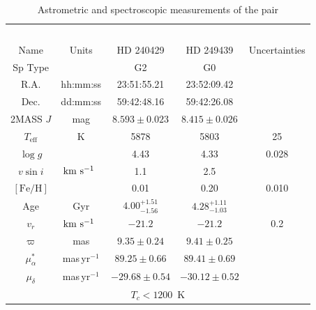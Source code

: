 \documentclass[12pt,letterpaper,margin=1in]{article}
\newcommand*\elem[1]{\ensuremath{\mathrm{#1}}}
\newcommand{\sunanalog}{\text{Krios}}
\newcommand{\bizarreone}{\text{Kronos}}
\newcommand{\kms}{\ensuremath{\rm km~s^{-1}}}
\begin{document}
\begin{table}[htpb]
  \centering
  \begin{threeparttable}
  \caption{Astrometric and spectroscopic measurements of the pair\label{tab:t1}}
\begin{tabular}{ccccc}
\hline\hline
                        &                & \sunanalog\            & \bizarreone\           &               \\
Name                    & Units          & HD 240429              & HD 249439              & Uncertainties \\
\hline
Sp Type                 &                & G2                     & G0                     &               \\
R.A.\tnote{a}           & hh:mm:ss       & 23:51:55.21            & 23:52:09.42            &               \\
Dec.\tnote{a}           & dd:mm:ss       & 59:42:48.16            & 59:42:26.08            &               \\
2MASS $J$\tnote{a}      & mag            & $8.593 \pm 0.023$      & $8.415 \pm 0.026$      &               \\
$T_\mathrm{eff}$        & K              & 5878                   & 5803                   & 25            \\
$\log{g}$               &                & 4.43                   & 4.33                   & 0.028         \\
$v\sin{i}$              & \kms\          & 1.1                    & 2.5                    &               \\
$[\elem{Fe}/\elem{H}]$  &                & 0.01                   & 0.20                   & 0.010         \\
Age\tnote{b}            & Gyr            & $4.00_{-1.56}^{+1.51}$ & $4.28_{-1.03}^{+1.11}$ &               \\
$v_r$                   & \kms\          & $-21.2$                & $-21.2$                & 0.2           \\
$\varpi$\tnote{a}       & mas            & $9.35 \pm 0.24$        & $9.41 \pm 0.25$        &               \\
$\mu_\alpha^*$\tnote{a} & mas\,yr$^{-1}$ & $89.25 \pm 0.66$       & $89.41 \pm 0.69$       &               \\
$\mu_\delta$\tnote{a}   & mas\,yr$^{-1}$ & $-29.68 \pm 0.54$      & $-30.12 \pm 0.52$      &               \\
\hline
\multicolumn{5}{c}{$T_c < 1200$~K} \\

\end{tabular}
\end{threeparttable}
\end{table}
\end{document}
